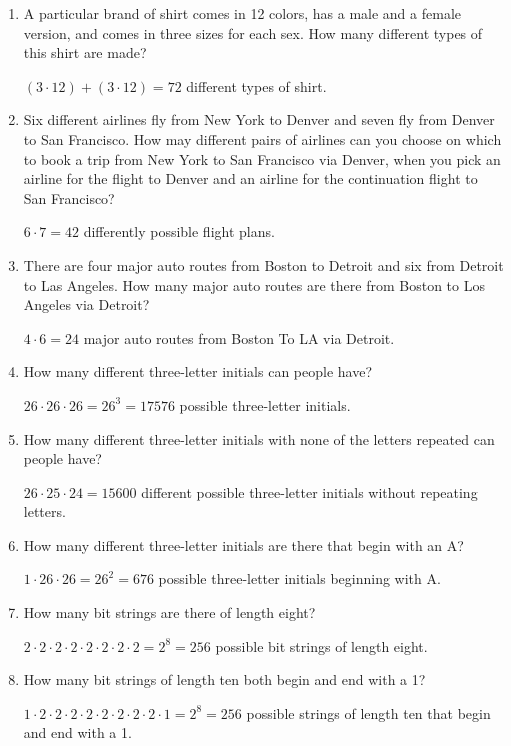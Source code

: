 \documentclass[11pt]{article}
\begin{document}
\begin{enumerate}[label=\textbf{\arabic*.}]
	\item A particular brand of shirt comes in 12 colors, has a male and a female version, and comes in three sizes for each sex. How many different types of this shirt are made?
	
	$(3 \cdot 12) + (3 \cdot 12) = 72$ different types of shirt.
	
	\item Six different airlines fly from New York to Denver and seven fly from Denver to San Francisco. How may different pairs of airlines can you choose on which to book a trip from New York to San Francisco via Denver, when you pick an airline for the flight to Denver and an airline for the continuation flight to San Francisco?
	
	$6 \cdot 7 = 42$ differently possible flight plans.
	
	\item There are four major auto routes from Boston to Detroit and six from Detroit to Las Angeles. How many major auto routes are there from Boston to Los Angeles via Detroit?
	
	$4 \cdot 6 = 24$ major auto routes from Boston To LA via Detroit.
	
	\item How many different three-letter initials can people have?
	
	$26 \cdot 26 \cdot 26 = 26^3 = 17576$ possible three-letter initials.
	
	\item How many different three-letter initials with none of the letters repeated can people have?
	
	$26 \cdot 25 \cdot 24 = 15600$ different possible three-letter initials without repeating letters.
	
	\item How many different three-letter initials are there that begin with an A?
	
	$1 \cdot 26 \cdot 26 = 26^2 = 676$ possible three-letter initials beginning with A.
	
	\item How many bit strings are there of length eight?
	
	$2 \cdot 2 \cdot 2 \cdot 2 \cdot 2 \cdot 2 \cdot 2 \cdot 2 = 2^8 = 256$ possible bit strings of length eight.
	
	\item How many bit strings of length ten both begin and end with a 1?
	
	$1 \cdot 2 \cdot 2 \cdot 2 \cdot 2 \cdot 2 \cdot 2 \cdot 2 \cdot 2 \cdot 1 = 2^8 = 256$ possible strings of length ten that begin and end with a 1.
	

\end{enumerate}
\end{document}
